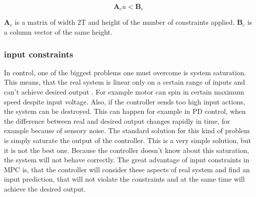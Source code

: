 \documentclass{article}
\begin{document}
\begin{equation}
\textbf{A}_cu<\textbf{B}_c
\end{equation}

$\textbf{A}_c$ is a matrix of width 2T and height of the number of constraints applied. $\textbf{B}_c$ is a column vector of the same height.

\subsubsection{input constraints}
In control, one of the biggest problems one must overcome is system saturation. This means, that the real system is linear only on a certain range of inputs and can't achieve desired output \cite{saturation}. For example motor can spin in certain maximum speed despite input voltage. Also, if the controller sends too high input actions, the system can be destroyed. This can happen for example in PD control, when the difference between real and desired output changes rapidly in time, for example because of sensory noise.
The standard  solution for this kind of problem is simply saturate the output of the controller. This is a very simple solution, but it is not the best one. Because the controller doesn't know about this saturation, the system will not behave correctly.
The great advantage of input constraints in MPC is, that the controller will consider these aspects of real system and find an input prediction, that will not violate the constraints and at the same time will achieve the desired output. 

\end{document}
